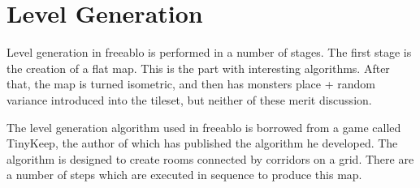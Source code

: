 \newpage
	
\section{Level Generation}
    Level generation in freeablo is performed in a number of stages. The first stage is the creation of a flat map. This is the part with interesting algorithms.
    After that, the map is turned isometric, and then has monsters place + random variance introduced into the tileset, but neither of these merit discussion.

    \mbox{}

    The level generation algorithm used in freeablo is borrowed from a game called TinyKeep\cite{tinykeep}, the author of which has published the algorithm he developed\cite{tinygen}.
    The algorithm is designed to create rooms connected by corridors on a grid.
    There are a number of steps which are executed in sequence to produce this map.
